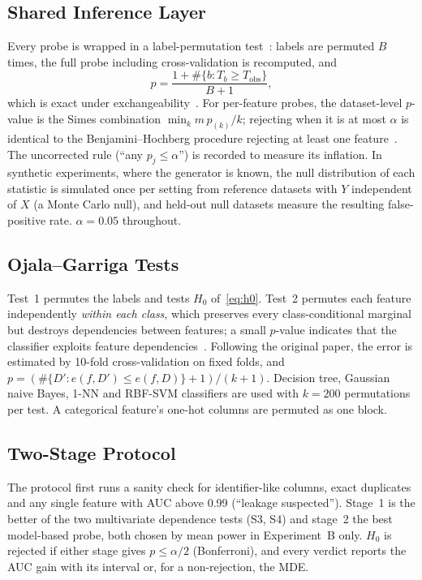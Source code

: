 \subsection{Shared Inference Layer}

Every probe is wrapped in a label-permutation test~\cite{ojala2010}: labels are permuted $B$ times, the full probe including cross-validation is recomputed, and
\begin{equation}
p=\frac{1+\#\{b: T_b\ge T_{\mathrm{obs}}\}}{B+1},
\end{equation}
which is exact under exchangeability~\cite{hemerik2018,phipson2010}. For per-feature probes, the dataset-level $p$-value is the Simes combination $\min_k m\,p_{(k)}/k$; rejecting when it is at most $\alpha$ is identical to the Benjamini--Hochberg procedure rejecting at least one feature~\cite{korthauer2019}. The uncorrected rule (``any $p_j\le\alpha$'') is recorded to measure its inflation. In synthetic experiments, where the generator is known, the null distribution of each statistic is simulated once per setting from reference datasets with $Y$ independent of $X$ (a Monte Carlo null), and held-out null datasets measure the resulting false-positive rate. $\alpha=0.05$ throughout.

\subsection{Ojala--Garriga Tests}

Test~1 permutes the labels and tests $H_0$ of~\eqref{eq:h0}. Test~2 permutes each feature independently \emph{within each class}, which preserves every class-conditional marginal but destroys dependencies between features; a small $p$-value indicates that the classifier exploits feature dependencies~\cite{ojala2010}. Following the original paper, the error is estimated by 10-fold cross-validation on fixed folds, and $p=(\#\{D': e(f,D')\le e(f,D)\}+1)/(k+1)$. Decision tree, Gaussian naive Bayes, 1-NN and RBF-SVM classifiers are used with $k=200$ permutations per test. A categorical feature's one-hot columns are permuted as one block.

\subsection{Two-Stage Protocol}

The protocol first runs a sanity check for identifier-like columns, exact duplicates and any single feature with AUC above 0.99 (``leakage suspected''). Stage~1 is the better of the two multivariate dependence tests (S3, S4) and stage~2 the best model-based probe, both chosen by mean power in Experiment~B only. $H_0$ is rejected if either stage gives $p\le\alpha/2$ (Bonferroni), and every verdict reports the AUC gain with its interval or, for a non-rejection, the MDE.
